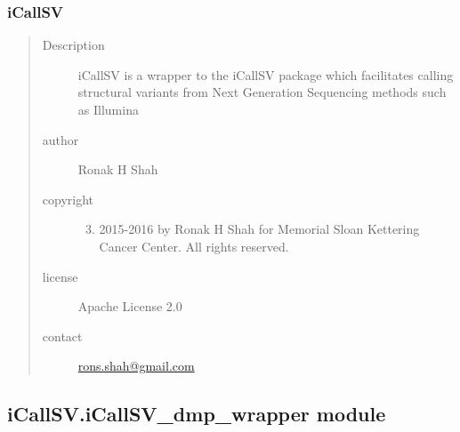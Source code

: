 \documentclass[letterpaper,10pt,english]{sphinxmanual}
\begin{document}
\subsubsection{iCallSV}
\label{iCallSV:id7}\begin{quote}\begin{description}
\item[{Description}] \leavevmode
iCallSV is a wrapper to the iCallSV package which facilitates calling structural variants from Next Generation Sequencing methods such as Illumina

\item[{author}] \leavevmode
Ronak H Shah

\item[{copyright}] \leavevmode\begin{enumerate}
\setcounter{enumi}{2}
\item {} 
2015-2016 by Ronak H Shah for Memorial Sloan Kettering Cancer Center. All rights reserved.

\end{enumerate}

\item[{license}] \leavevmode
Apache License 2.0

\item[{contact}] \leavevmode
\href{mailto:rons.shah@gmail.com}{rons.shah@gmail.com}

\end{description}\end{quote}


\subsection{iCallSV.iCallSV\_dmp\_wrapper module}
\label{iCallSV:icallsv-icallsv-dmp-wrapper-module}\label{iCallSV:module-iCallSV.iCallSV_dmp_wrapper}
\end{document}
